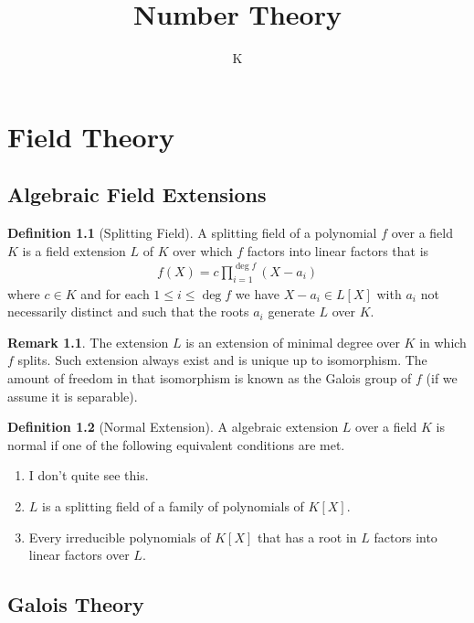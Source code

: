 \documentclass[a4paper]{book}
\title{Number Theory}
\author{K}
\theoremstyle{definition}
\newtheorem{definition}{Definition}[]
\newtheorem*{remark}{Remark}
\begin{document}
\tableofcontents
\part{Field Theory}

\chapter{Algebraic Field Extensions}
\begin{defbox}
    \begin{definition}[Splitting Field]
        A splitting field of a polynomial \(f\) over a field \(K\) is a field extension \(L\) of \(K\) over which \(f\) factors into linear factors that is
        \begin{align*}
            f(X) = c \prod_{i=1}^{\deg f} (X - a_i)
        \end{align*}
        where \(c \in K\) and for each \(1 \leq i \leq \deg f\) we have \(X - a_i \in L[X]\) with \(a_i\) not necessarily distinct and such that the roots \(a_i\) generate \(L\) over \(K\).
    \end{definition}
\end{defbox}
\begin{remark}
    The extension \(L\) is an extension of minimal degree over \(K\) in which \(f\) splits. Such extension always exist and is unique up to isomorphism. The amount of freedom in that isomorphism is known as the Galois group of \(f\) (if we assume it is separable).
\end{remark}

\begin{defbox}
    \begin{definition}[Normal Extension]
        A algebraic extension \(L\) over a field \(K\) is normal if one of the following equivalent conditions are met.
        \begin{enumerate}
            \item I don't quite see this.
            \item \(L\) is a splitting field of a family of polynomials of \(K[X]\).
            \item Every irreducible polynomials of \(K[X]\) that has a root in \(L\) factors into linear factors over \(L\).
        \end{enumerate}
    \end{definition}
\end{defbox}

\chapter{Galois Theory}
\end{document}
